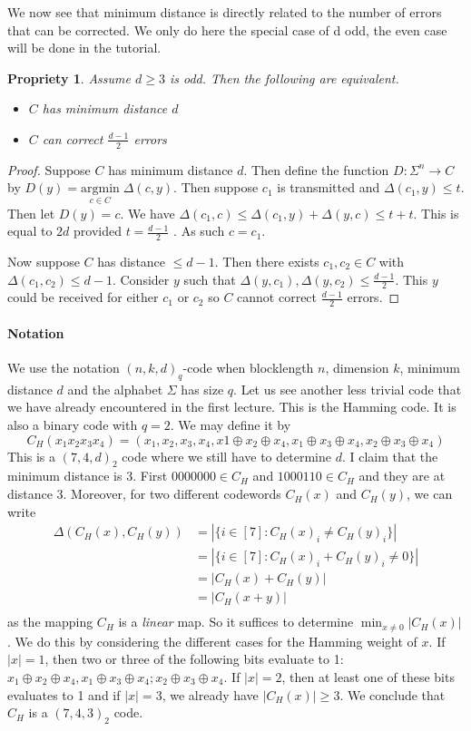 \documentclass{article}
\newtheorem{prop}{Propriety}
\begin{document}
We now see that minimum distance is directly related to the number of errors that can be
corrected. We only do here the special case of d odd, the even case will be done in the tutorial.
\begin{prop}
Assume $d \geq 3$ is odd. Then the following are equivalent.
\begin{itemize}
\item $C$ has minimum distance $d$
\item $C$ can correct $\frac{d-1}{2}$ errors
\end{itemize}
\end{prop}

\begin{proof}
Suppose $C$ has minimum distance $d$. Then define the function $D : \Sigma^n \to C$ by $D(y) = \underset{c\in C}{\text{argmin}} \;\Delta(c, y)$. Then suppose $c_1$ is transmitted and $\Delta(c_1, y) \leq t$. Then let $D(y) = c$. We have $\Delta (c_1, c) \leq \Delta (c_1, y) + \Delta (y, c) \leq t + t$. This is equal to $2d$ provided $t = \frac{d-1}{2}$ . As such
$c = c_1$.

Now suppose $C$ has distance $\leq d - 1$. Then there exists $c_1, c_2 \in C$ with $\Delta (c_1, c_2) \leq d - 1$. Consider $y$ such that $\Delta (y, c_1), \Delta (y, c_2) \leq \frac{d-1}{2}$. This $y$ could be received for either $c_1$ or $c_2$ so $C$
cannot correct $\frac{d-1}{2}$ errors.
\end{proof}

\paragraph{Notation} We use the notation $(n, k, d)_q$-code when blocklength $n$, dimension $k$, minimum distance $d$ and the alphabet $\Sigma$ has size $q$. Let us see another less trivial code that we have already encountered in the first lecture. This is the Hamming code. It is also a binary code with $q = 2$. We may define it by
\[
C_H(x_1x_2x_3x_4) = (x_1, x_2, x_3, x_4, x1 \oplus x_2 \oplus x_4, x_1 \oplus x_3 \oplus x_4, x_2 \oplus x_3 \oplus x_4)
\]
This is a $(7, 4, d)_2$ code where we still have to determine $d$. I claim that the minimum distance is 3. First $0000000 \in C_H$ and $1000110 \in C_H$ and they are at distance 3. Moreover, for two different codewords $C_H(x)$ and $C_H(y)$, we can write
\begin{align*}
\Delta(C_H(x),C_H(y)) & = |\{ i \in [7] : C_H(x)_i \neq C_H(y)_i\}|\\
&= |\{i \in [7] : C_H(x)_i + C_H(y)_i \neq 0 \}|\\
&= | C_H(x) + C_H(y)|\\
&= |C_H(x + y)|\\
\end{align*}
as the mapping $C_H$ is a \emph{linear} map. So it suffices to determine $\min_{x\neq 0} |C_H(x)|$. We do this by considering the different cases for the Hamming weight of $x$. If $|x| = 1$, then two or three of the following bits evaluate to 1: $x_1 \oplus x_2 \oplus  x_4, x_1 \oplus x_3 \oplus x_4; x_2 \oplus x_3 \oplus x_4$. If $|x| = 2$, then at least one of these bits evaluates to 1 and if $|x| = 3$, we already have $|C_H(x)| \geq 3$. We conclude that $C_H$ is a $(7, 4, 3)_2$ code.
\end{document}
